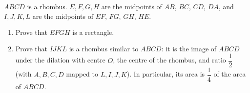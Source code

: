 $ABCD$ is a rhombus. $E,F,G,H$ are the midpoints of $AB$, $BC$, $CD$, $DA$, and $I,J,K,L$ are the midpoints of $EF$, $FG$, $GH$, $HE$.
\begin{enumerate}
\item[(a)] Prove that $EFGH$ is a rectangle.
\item[(b)] Prove that $IJKL$ is a rhombus similar to $ABCD$: it is the image of $ABCD$ under the dilation with centre $O$, the centre of the rhombus, and ratio $\dfrac12$ (with $A,B,C,D$ mapped to $L,I,J,K$). In particular, its area is $\dfrac14$ of the area of $ABCD$.
\end{enumerate}
